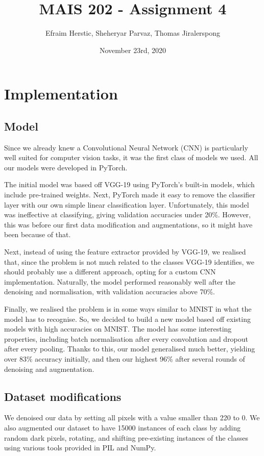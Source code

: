 \documentclass[11pt]{article}
\title{MAIS 202 - Assignment 4}
\author{Efraim Herstic, Sheheryar Parvaz, Thomas Jiralerspong}
\date{November 23rd, 2020}
\begin{document}
\maketitle

\section{Implementation}

\subsection{Model}
Since we already knew a Convolutional Neural Network (CNN) is
particularly well suited for computer vision tasks, it was the first
class of models we used. All our models were developed in PyTorch.

The initial model was based off VGG-19 using PyTorch's built-in
models\cite{torchvisionmodels}, which include pre-trained weights. Next,
PyTorch made it easy to remove the classifier layer with our own simple
linear classification layer. Unfortunately, this model was ineffective
at classifying, giving validation accuracies under 20\%. However, this
was before our first data modification and augmentations, so it might
have been because of that.

Next, instead of using the feature extractor provided by VGG-19, we
realised that, since the problem is not much related to the classes
VGG-19 identifies, we should probably use a different approach, opting
for a custom CNN implementation. Naturally, the model performed
reasonably well after the denoising and normalisation, with validation
accuracies above 70\%.

Finally, we realised the problem is in some ways similar to MNIST in
what the model has to recognise. So, we decided to build a new model
based off existing models with high accuracies on
MNIST\cite{kagglemnist}.  The model has some interesting properties,
including batch normalisation after every convolution and dropout after
every pooling. Thanks to this, our model generalised much better,
yielding over 83\% accuracy initially, and then our highest 96\% after
several rounds of denoising and augmentation.

\subsection{Dataset modifications}
We denoised our data by setting all pixels with a value smaller than 220
to 0. We also augmented our dataset to have 15000 instances of each
class by adding random dark pixels, rotating, and shifting pre-existing
instances of the classes using various tools provided in PIL and NumPy.
\end{document}
